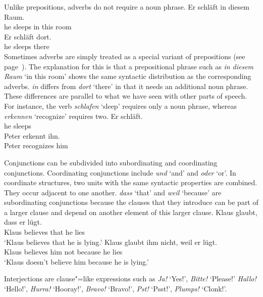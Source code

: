 Unlike prepositions, adverbs do not require a noun phrase. 
\eal
\ex
\gll Er schläft in diesem Raum.\\
	 he sleeps in this room\\
\ex
\gll Er schläft dort.\\
	 he sleeps there\\
\zl
\addlines
Sometimes adverbs are simply treated as a special variant of prepositions (see page~\pageref{Seite-Adverbien-PP}). The explanation for this is that
a prepositional phrase such as \emph{in diesem Raum} `in this room' shows the same syntactic
distribution as the corresponding adverbs. \emph{in} differs
from \emph{dort} `there' in that it needs an additional noun phrase. These differences are
parallel to what we have seen with other parts of speech. For instance, the verb \emph{schlafen} `sleep' requires only a noun phrase, whereas \emph{erkennen} `recognize' requires two.
\eal
\ex 
\gll Er schläft.\\
     he sleeps\\
\ex 
\gll Peter erkennt ihn.\\
     Peter recognizes him\\
\zl


Conjunctions can be subdivided into subordinating and coordinating conjunctions. Coordinating conjunctions include
\emph{und} `and' and \emph{oder} `or'. In coordinate structures, two units with the same syntactic properties are
combined. They occur adjacent to one another. \emph{dass} `that' and \emph{weil} `because' are subordinating conjunctions because
the clauses that they introduce can be part of a larger clause and depend on another element of this
larger clause.
\eal
\ex 
\gll Klaus glaubt, dass er lügt.\\
	 Klaus believes that he lies\\
\glt `Klaus believes that he is lying.'
\ex 
\gll Klaus glaubt ihm nicht, weil er lügt.\\
	 Klaus believes him not because he lies\\
\glt `Klaus doesn't believe him because he is lying.'
\zl

Interjections are clause"=like expressions such as \emph{Ja!} `Yes!', \emph{Bitte!} `Please!' %
\emph{Hallo!} `Hel\-lo!', 
 \emph{Hurra!} `Hooray!', \emph{Bravo!} `Bravo!', \emph{Pst!} `Psst!', \emph{Plumps!} `Clonk!'.
 
